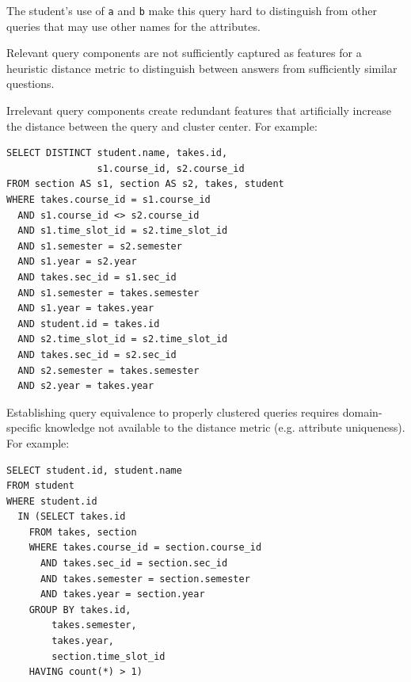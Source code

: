 The student's use of \texttt{a} and \texttt{b} make this query hard to distinguish from other queries that may use other names for the attributes.

\smallskip
{} Relevant query components are not sufficiently captured as features for a heuristic distance metric to distinguish between answers from sufficiently similar questions.

\smallskip
{} Irrelevant query components create redundant features that artificially increase the distance between the query and cluster center.
For example:
{\footnotesize
\begin{verbatim}
SELECT DISTINCT student.name, takes.id, 
                s1.course_id, s2.course_id
FROM section AS s1, section AS s2, takes, student
WHERE takes.course_id = s1.course_id
  AND s1.course_id <> s2.course_id
  AND s1.time_slot_id = s2.time_slot_id
  AND s1.semester = s2.semester
  AND s1.year = s2.year
  AND takes.sec_id = s1.sec_id
  AND s1.semester = takes.semester
  AND s1.year = takes.year
  AND student.id = takes.id
  AND s2.time_slot_id = s2.time_slot_id
  AND takes.sec_id = s2.sec_id
  AND s2.semester = takes.semester
  AND s2.year = takes.year
\end{verbatim}
}

\smallskip
{} Establishing query equivalence to properly clustered queries requires domain-specific knowledge not available to the distance metric (e.g. attribute uniqueness).
For example:
{\footnotesize
\begin{verbatim}
SELECT student.id, student.name
FROM student
WHERE student.id
  IN (SELECT takes.id
    FROM takes, section
    WHERE takes.course_id = section.course_id
      AND takes.sec_id = section.sec_id
      AND takes.semester = section.semester
      AND takes.year = section.year
    GROUP BY takes.id,
        takes.semester,
        takes.year,
        section.time_slot_id
    HAVING count(*) > 1)
\end{verbatim}
}

%
%
%		
%		

